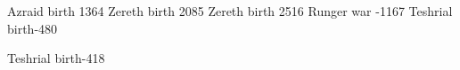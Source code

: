 \newcommand{\Firaxel}      {F\ilongresphan r\adarkresphan xel\xspace}
\newcommand{\Menessiaraid} {Menessi\adarkresphan r\adarkresphan id\xspace}
\newcommand{\Teshrial}     {Teshri\aflatresphan l\xspace}
\newcommand{\Zeirath}      {\Teshrial}
\newcommand{\Tuerdal}      {Tu\"erd\adarkresphan l{}\xspace} %
\newcommand{\Vesrai}       {Vesr\adarkresphan i{}\xspace} %
\newcommand{\Zereth}       {Zereth{}\xspace} %

       {Azraid birth}  {1364}
       {Zereth birth}  {2085}
      {Zereth birth}  {2516}
     {Runger war}    {-1167}
      {Teshrial birth}{-480}

\begin{comment}
\subsubsection{\Thelyadeth}
\end{comment}

\newcommand{\Ganethed}     {G\aflatresphan{}nethed\xspace} 
\newcommand{\Jeshred}      {Jeshred{}\xspace} %
\newcommand{\Paerzim}      {V\aeresphan rz\ilongresphan m\xspace} %
\newcommand{\Urizeth}      {Urizeth\xspace}

     {Teshrial birth}{-418}



\begin{comment}
\subsection{\Kezerad}
\end{comment}

\begin{comment}
\subsubsection{\Satharioth}
\end{comment}

\newcommand{\Sithiyacaan}      {Sithi\y \adarkresphan c\alongresphan n\xspace} %
\newcommand{\MoriceHerette}    {Mori\c ce \Herette} %
\newcommand{\Herette}          {H\'er\`ette\xspace}

\begin{comment}
\subsubsection{\Ketherain}
\end{comment}

